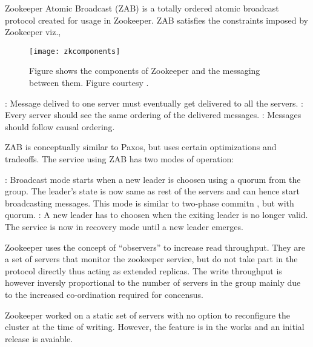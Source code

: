 Zookeeper Atomic Broadcast (ZAB) 
\citep{Reed:2008:STO:1529974.1529978, JunqueiraRS11} is a 
totally ordered atomic broadcast protocol created for usage in Zookeeper. ZAB
satisfies the constraints imposed by Zookeeper viz.,

\begin{figure}
  \texttt{[image: zkcomponents]}
  \caption[Zookeeper Components]{%
    Figure shows the components of Zookeeper and the messaging between them.
    Figure courtesy \citet{zookeeper}.}
  \label{figure:megastore}
\end{figure}


\begin{itemize}
    : Message delived to one server must eventually
    get delivered to all the servers.
    : Every server should see the same ordering of the 
    delivered messages.
    : Messages should follow causal%
    ordering.
\end{itemize}

ZAB is conceptually similar to Paxos, but uses certain optimizations and 
tradeoffs. The service using ZAB has two modes of operation:

\begin{itemize}
    : Broadcast mode starts when a new leader is choosen
    using a quorum from the group. The leader's state is now same as rest of
    the servers and can hence start broadcasting messages.
    This mode is similar to two-phase commitn \citep{Gray78}, but with quorum.
    : A new leader has to choosen when the exiting leader 
    is no longer valid. The service is now in recovery mode until a new leader
    emerges.
\end{itemize}

Zookeeper uses the concept of ``observers'' to increase read throughput. They 
are a set of servers that monitor the zookeeper service, but do not take part
in the protocol directly thus acting as extended replicas. The write throughput
is however inversly proportional to the number of servers in the group mainly
due to the increased co-ordination required for concensus.

Zookeeper worked on a static set of servers with no option to reconfigure the
cluster at the time of writing. However, the feature is in the works 
\citep{zab2012}and an initial release is avaiable.

